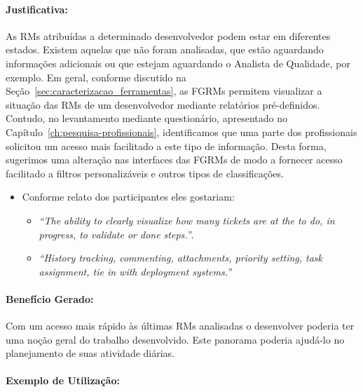 
\paragraph{Justificativa:}
\label{par:justificativa_s04}

As RMs atribuídas a determinado desenvolvedor podem estar em diferentes estados.
Existem aquelas que não foram analisadas, que estão aguardando informações
adicionais ou que estejam aguardando o Analista de Qualidade, por exemplo. Em
geral, conforme discutido na Seção~\ref{sec:caracterizacao_ferramentas}, as
FGRMs permitem visualizar a situação das RMs de um desenvolvedor mediante
relatórios pré-definidos. Contudo, no levantamento mediante questionário,
apresentado no Capítulo~\ref{ch:pesquisa-profissionais}, identificamos que uma
parte dos profissionais solicitou um acesso mais facilitado a este tipo de
informação. Desta forma, sugerimos uma alteração nas interfaces das FGRMs de
modo a fornecer acesso facilitado a filtros personalizáveis e outros tipos de
classificações.

\begin{itemize}
	\item Conforme relato dos participantes eles gostariam:
	\begin{itemize}
		\item \textit{``The ability to clearly visualize how many tickets are at
				the to do, in progress, to validate or done steps.''}.
		\item \textit{``History tracking, commenting, attachments, priority
				setting, task assignment, tie in with deployment systems.''}
	\end{itemize}
\end{itemize}

\paragraph{Benefício Gerado:}
\label{par:papéis_afetados_s04}

Com um acesso mais rápido às últimas RMs analisadas o desenvolver poderia ter
uma noção geral do trabalho desenvolvido. Este panorama poderia ajudá-lo no
planejamento de suas atividade diárias.

\paragraph{Exemplo de Utilização:}
\label{par:exemplo_de_utilização_s04}

